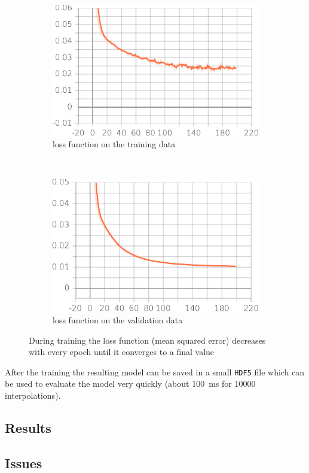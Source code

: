 \begin{figure}[h] %
	\centering
	\begin{subfigure}[t]{0.5\textwidth}
		\centering
		\includegraphics[width=\linewidth]{images/loss.pdf}
		\caption{loss function on the training data}
		\label{fig:loss}
	\end{subfigure}%
	~ 
	\begin{subfigure}[t]{0.5\textwidth}
		\centering
		\includegraphics[width=\linewidth]{images/val_loss.pdf}
		\caption{loss function on the validation data}
		\label{fig:val_loss}
	\end{subfigure}
	\caption{During training the loss function (mean squared error) decreases with every epoch until it converges to a final value}
	\label{fig:loss_val}
	
\end{figure}

After the training the resulting model can be saved in a small \texttt{HDF5} file which can be used to evaluate the model very quickly (about \SI{100}{\milli\second} for \num{10000} interpolations).


\subsection{Results}

\subsection{Issues}
